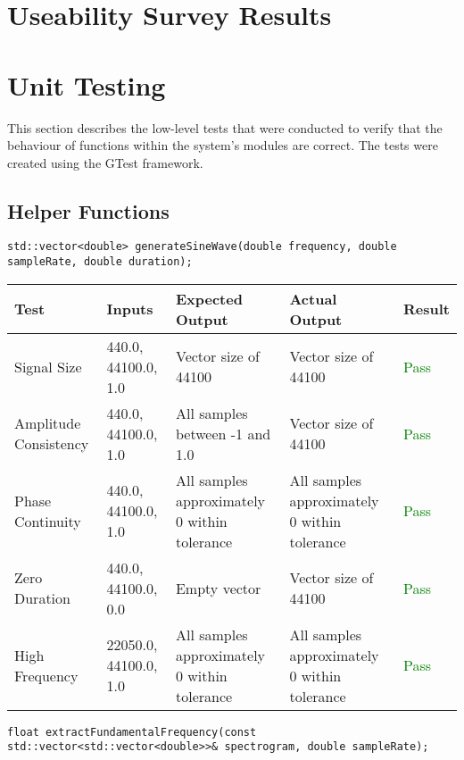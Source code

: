 \documentclass[12pt, titlepage]{article}
\begin{document}
\section{Useability Survey Results}

\section{Unit Testing}

This section describes the low-level tests that were conducted to verify that the behaviour of 
functions within the system's modules are correct. The tests were created using the GTest framework.

\subsection{Helper Functions}

\texttt{std::vector<double> generateSineWave(double frequency, double sampleRate, double duration);}
\begin{longtable}{|L{3cm}|L{2cm}|L{2cm}|L{2cm}|l|}
  \hline
  \textbf{Test} & \textbf{Inputs} & \textbf{Expected Output} & \textbf{Actual Output} & \textbf{Result} \\
  \hline
  Signal Size & 440.0, 44100.0, 1.0 & Vector size of 44100 & Vector size of 44100 & \textcolor{green}{Pass} \\
  \hline
  Amplitude Consistency & 440.0, 44100.0, 1.0 & All samples between -1 and 1.0 & Vector size of 44100 & \textcolor{green}{Pass} \\
  \hline
  Phase Continuity & 440.0, 44100.0, 1.0 & All samples approximately 0 within tolerance & All samples approximately 0 within tolerance & \textcolor{green}{Pass} \\
  \hline
  Zero Duration & 440.0, 44100.0, 0.0 & Empty vector & Vector size of 44100 & \textcolor{green}{Pass} \\
  \hline
  High Frequency & 22050.0, 44100.0, 1.0 & All samples approximately 0 within tolerance & All samples approximately 0 within tolerance & \textcolor{green}{Pass} \\
  \hline
\end{longtable}


\noindent\texttt{float extractFundamentalFrequency(const std::vector<std::vector<double>>\& spectrogram, double sampleRate);}
\end{document}
